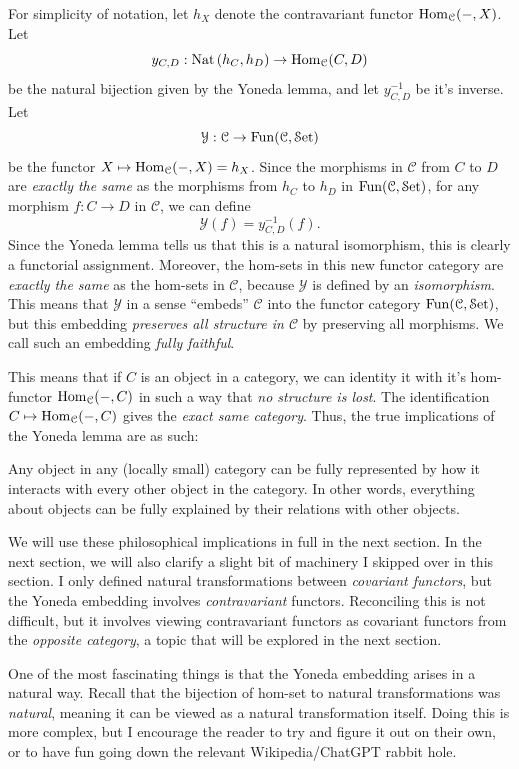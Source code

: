 For simplicity of notation, let $h_X$ denote the contravariant functor $\operatorname{Hom}_{\mathcal{C} }(-, X) $. Let
\[
	y_{C,D}  : \operatorname{Nat} \left( h_C,h_D \right)  \to \operatorname{Hom}_{\mathcal{C} }(C, D) 
\]
be the natural bijection given by the Yoneda lemma, and let $y_{C,D} ^{-1} $ be it's inverse. Let
\[
	\mathcal{Y} : \mathcal{C}  \to \operatorname{Fun}(\mathcal{C} ,\mathcal{S}\mathrm{et} )
\]
be the functor $X\mapsto \operatorname{Hom}_{\mathcal{C} }(-, X) =h_X$. Since the morphisms in $\mathcal{C} $ from $C$ to $D$ are \emph{exactly the same} as the morphisms from $h_C$ to $h_D$ in $\operatorname{Fun}(\mathcal{C} ,\mathcal{S}\mathrm{et} )$, for any morphism $f : C \to D$ in $\mathcal{C} $, we can define
\[
	\mathcal{Y} (f) = y_{C,D} ^{-1} (f)
.\]
Since the Yoneda lemma tells us that this is a natural isomorphism, this is clearly a functorial assignment. Moreover, the hom-sets in this new functor category are \emph{exactly the same} as the hom-sets in $\mathcal{C} $, because $\mathcal{Y} $ is defined by an \emph{isomorphism}. This means that $\mathcal{Y} $ in a sense ``embeds'' $\mathcal{C} $ into the functor category $\operatorname{Fun}(\mathcal{C} ,\mathcal{S}\mathrm{et} )$, but this embedding \emph{preserves all structure in $\mathcal{C} $} by preserving all morphisms. We call such an embedding \emph{fully faithful}.

This means that if $C$ is an object in a category, we can identity it with it's hom-functor $\operatorname{Hom}_{\mathcal{C} }(-, C) $ in such a way that \emph{no structure is lost}. The identification $C\mapsto \operatorname{Hom}_{\mathcal{C} }(-, C) $ gives the \emph{exact same category}. Thus, the true implications of the Yoneda lemma are as such:
\begin{displayquote}
	Any object in any (locally small) category can be fully represented by how it interacts with every other object in the category. In other words, everything about objects can be fully explained by their relations with other objects.
\end{displayquote}
We will use these philosophical implications in full in the next section. In the next section, we will also clarify a slight bit of machinery I skipped over in this section. I only defined natural transformations between \emph{covariant functors}, but the Yoneda embedding involves \emph{contravariant} functors. Reconciling this is not difficult, but it involves viewing contravariant functors as covariant functors from the \emph{opposite category}, a topic that will be explored in the next section.

One of the most fascinating things is that the Yoneda embedding arises in a natural way. Recall that the bijection of hom-set to natural transformations was \emph{natural}, meaning it can be viewed as a natural transformation itself. Doing this is more complex, but I encourage the reader to try and figure it out on their own, or to have fun going down the relevant Wikipedia/ChatGPT rabbit hole.
